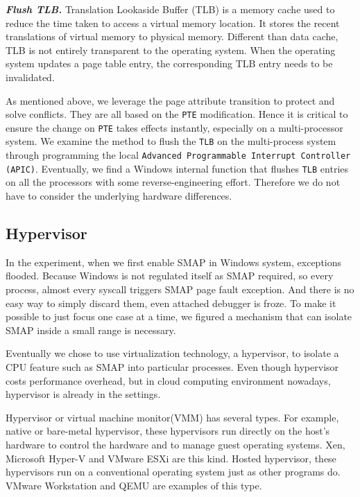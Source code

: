 
\textbf{\textit{Flush TLB.}} Translation Lookaside Buffer (TLB) is a memory cache used to reduce the time taken to access a virtual memory location. It stores the recent translations of virtual memory to physical memory. Different than data cache, TLB is not entirely transparent to the operating system. When the operating system updates a page table entry, the corresponding TLB entry needs to be invalidated.  

As mentioned above, we leverage the page attribute transition to protect and solve conflicts. They are all based on the \texttt{PTE} modification. Hence it is critical to ensure the change on \texttt{PTE} takes effects instantly, especially on a multi-processor system. We examine the method to flush the \texttt{TLB} on the multi-process system through programming the local \texttt{Advanced Programmable Interrupt Controller (APIC)}. Eventually, we find a Windows internal function that flushes \texttt{TLB} entries on all the processors with some reverse-engineering effort. Therefore we do not have to consider the underlying hardware differences.



\subsection{Hypervisor}

In the experiment, when we first enable SMAP in Windows system, exceptions flooded. Because Windows is not regulated itself as SMAP required, so every process, almost every syscall triggers SMAP page fault exception. And there is no easy way to simply discard them, even attached debugger is froze. To make it possible to just focus one case at a time, we figured a mechanism that can isolate SMAP inside a small range is necessary.

Eventually we chose to use virtualization technology, a hypervisor, to isolate a CPU feature such as SMAP into particular processes. Even though hypervisor costs performance overhead, but in cloud computing environment nowadays, hypervisor is already in the settings.

Hypervisor or virtual machine monitor(VMM) has several types. For example, native or bare-metal hypervisor, these hypervisors run directly on the host's hardware to control the hardware and to manage guest operating systems. Xen, Microsoft Hyper-V and VMware ESXi are this kind. Hosted hypervisor, these hypervisors run on a conventional operating system just as other programs do. VMware Workstation and QEMU are examples of this type.

